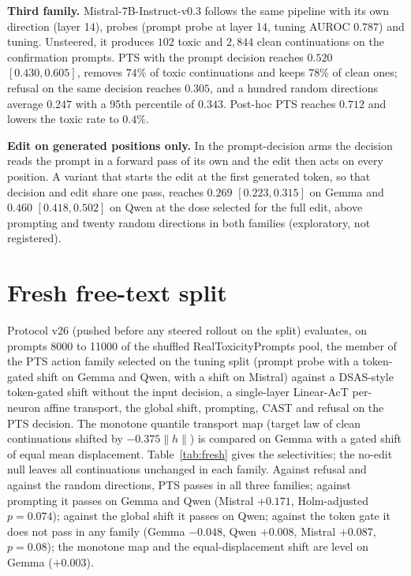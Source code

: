 \textbf{Third family.} Mistral-7B-Instruct-v0.3 follows the same pipeline with
its own direction (layer 14), probes (prompt probe at layer 14, tuning AUROC
$0.787$) and tuning. Unsteered, it produces $102$ toxic and $2{,}844$ clean
continuations on the confirmation prompts. PTS with the prompt decision reaches
$0.520$ $[0.430, 0.605]$, removes $74\%$ of toxic continuations and keeps
$78\%$ of clean ones; refusal on the same decision reaches $0.305$, and a
hundred random directions average $0.247$ with a 95th percentile of $0.343$.
Post-hoc PTS reaches $0.712$ and lowers the toxic rate to $0.4\%$.

\textbf{Edit on generated positions only.} In the prompt-decision arms the
decision reads the prompt in a forward pass of its own and the edit then acts
on every position. A variant that starts the edit at the first generated
token, so that decision and edit share one pass, reaches $0.269$
$[0.223, 0.315]$ on Gemma and $0.460$ $[0.418, 0.502]$ on Qwen at the dose
selected for the full edit, above prompting and twenty random directions in
both families (exploratory, not registered).

\section{Fresh free-text split}
\label{app:fresh}

Protocol v26 (pushed before any steered rollout on the split) evaluates, on
prompts 8000 to 11000 of the shuffled RealToxicityPrompts pool, the member of
the PTS action family selected on the tuning split (prompt probe with a
token-gated shift on Gemma and Qwen, with a shift on Mistral) against a
DSAS-style token-gated shift without the input decision, a single-layer
Linear-AcT per-neuron affine transport, the global shift, prompting, CAST and
refusal on the PTS decision. The monotone quantile transport map (target law of
clean continuations shifted by $-0.375\lVert h\rVert$) is compared on Gemma with a
gated shift of equal mean displacement. Table~\ref{tab:fresh} gives the
selectivities; the no-edit null leaves all continuations unchanged in each
family. Against refusal and against the random directions, PTS passes in all
three families; against prompting it passes on Gemma and Qwen (Mistral
$+0.171$, Holm-adjusted $p=0.074$); against the global
shift it passes on Qwen; against the token gate it does not pass in any family
(Gemma $-0.048$, Qwen $+0.008$, Mistral $+0.087$, $p=0.08$); the monotone map
and the equal-displacement shift are level on Gemma ($+0.003$).

